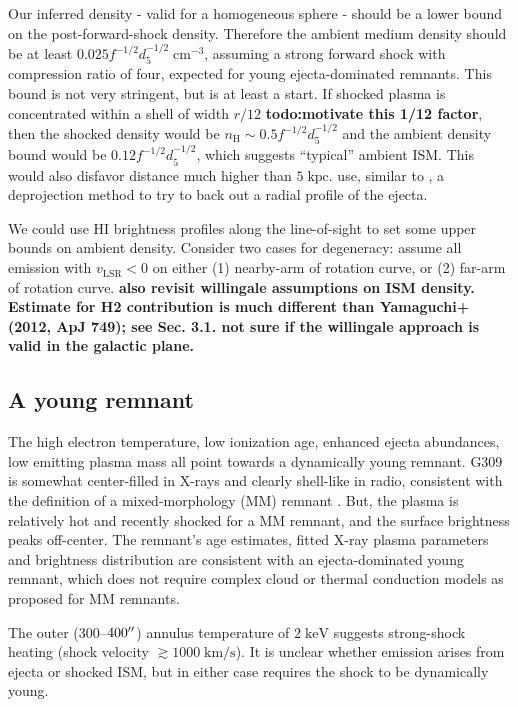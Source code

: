 \documentclass[preprint2,tighten,trackchanges]{aastex6}
\newcommand*{\mt}{\mathrm}
\newcommand*{\unit}[1]{\;\mt{#1}}  %
\begin{document}
Our inferred density - valid for a homogeneous sphere - should be a lower bound
on the post-forward-shock density.
Therefore the ambient medium density should be at least
$0.025 f^{-1/2} d_{5}^{-1/2} \unit{cm^{-3}}$, assuming a strong forward shock
with compression ratio of four, expected for young ejecta-dominated remnants.
This bound is not very stringent, but is at least a start.
If shocked plasma is concentrated within a shell of width $r/12$
\textbf{todo:motivate this 1/12 factor}, then the shocked density would be
$n_{\mt{H}} \sim 0.5 f^{-1/2} d_{5}^{-1/2}$
and the ambient density bound would be $0.12 f^{-1/2} d_{5}^{-1/2}$,
which suggests ``typical'' ambient ISM.
This would also disfavor distance much higher than $5 \unit{kpc}$.
\citet{katsuda2015} use, similar to \citet{kosenko2010}, a deprojection method
to try to back out a radial profile of the ejecta.

We could use HI brightness profiles along the line-of-sight to set some upper
bounds on ambient density.
Consider two cases for degeneracy: assume all emission with $v_{\mt{LSR}} < 0$
on either (1) nearby-arm of rotation curve, or (2) far-arm of rotation curve.
\textbf{also revisit willingale assumptions on ISM density.  Estimate for H2
contribution is much different than Yamaguchi+ (2012, ApJ 749); see Sec. 3.1.
not sure if the willingale approach is valid in the galactic plane.}

\subsection{A young remnant}

The high electron temperature, low ionization age, enhanced ejecta abundances,
low emitting plasma mass all point towards a dynamically young remnant.
G309 is somewhat center-filled in X-rays and clearly shell-like in radio,
consistent with the definition of a mixed-morphology (MM) remnant
\citep{rho1998}.
But, the plasma is relatively hot and recently shocked for a MM remnant, and
the surface brightness peaks off-center.
The remnant's age estimates, fitted X-ray plasma parameters and brightness
distribution are consistent with an ejecta-dominated young remnant, which
does not require complex cloud or thermal conduction models as proposed for MM
remnants.

The outer ($300$--$400\mbox{$^{\prime\prime}$}$) annulus temperature of $2 \unit{keV}$
suggests strong-shock heating (shock velocity $\gtrsim 1000 \unit{km/s}$).
It is unclear whether emission arises from ejecta or shocked ISM, but in either
case requires the shock to be dynamically young.
\end{document}
